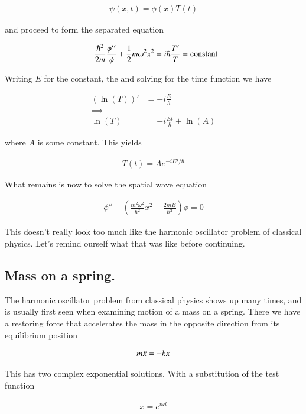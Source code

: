 \begin{align*}
\psi(x,t) = \phi(x) T(t)
\end{align*}

and proceed to form the separated equation

\begin{align*}
-\frac{\hbar^2}{2m} \frac{\phi''}{\phi} + \frac{1}{2} m \omega^2 x^2 = i \hbar \frac{T'}{T} = \text{constant}
\end{align*}

Writing $E$ for the constant, the and solving for the time function we have

\begin{align*}
(\ln(T))' &= -i \frac{E}{\hbar} \\
\implies \\
\ln(T) &= -i \frac{Et}{\hbar} + \ln(A)
\end{align*}

where $A$ is some constant.  This yields

\begin{align*}
T(t) = A e^{ -i E t/\hbar }
\end{align*}

What remains is now to solve the spatial wave equation

\begin{align}\label{eqn:harmonic_osc:spatial}
\phi'' - \left( \frac{m^2 \omega^2}{\hbar^2} x^2 - \frac{2m E}{\hbar^2}\right) \phi = 0
\end{align}

This doesn't really look too much like the harmonic oscillator problem of classical physics.  Let's remind ourself
what that was like before continuing.

\subsection{Mass on a spring. }

The harmonic oscillator problem from classical physics
shows up many times, and is usually first seen when examining motion
of a mass on a spring.  There we have a restoring force that accelerates the
mass in the opposite direction from its equilibrium position

\begin{align}
m \ddot{x} = -k x
\end{align}

This has two complex exponential solutions.  With a substitution of the test function

\begin{align*}
x = e^{i \omega t}
\end{align*}


